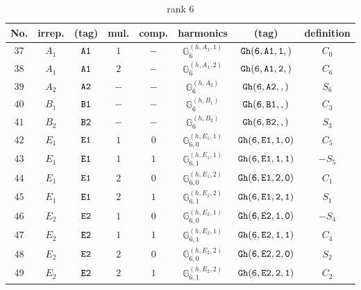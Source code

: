 \documentclass[fleqn,8pt]{jsarticle}
\begin{document}
\begin{table}[ht!]
\begin{center}
\caption{rank 6}
\renewcommand{\arraystretch}{1.3}
\begin{tabular}{cccccccc} \hline \hline
No. & irrep. & (tag) & mul. & comp. & harmonics & (tag) & definition \\ \hline
$ 37 $ & $ A_{1} $ & $ {\tt A1} $ & $ 1 $ & $ - $ & $ \mathbb{G}_{6}^{(h,A_{1},1)} $ & $ {\tt Gh(6,A1,1,)} $ & $ C_{0} $ \\
$ 38 $ & $ A_{1} $ & $ {\tt A1} $ & $ 2 $ & $ - $ & $ \mathbb{G}_{6}^{(h,A_{1},2)} $ & $ {\tt Gh(6,A1,2,)} $ & $ C_{6} $ \\
$ 39 $ & $ A_{2} $ & $ {\tt A2} $ & $ - $ & $ - $ & $ \mathbb{G}_{6}^{(h,A_{2})} $ & $ {\tt Gh(6,A2,,)} $ & $ S_{6} $ \\
$ 40 $ & $ B_{1} $ & $ {\tt B1} $ & $ - $ & $ - $ & $ \mathbb{G}_{6}^{(h,B_{1})} $ & $ {\tt Gh(6,B1,,)} $ & $ C_{3} $ \\
$ 41 $ & $ B_{2} $ & $ {\tt B2} $ & $ - $ & $ - $ & $ \mathbb{G}_{6}^{(h,B_{2})} $ & $ {\tt Gh(6,B2,,)} $ & $ S_{3} $ \\
$ 42 $ & $ E_{1} $ & $ {\tt E1} $ & $ 1 $ & $ 0 $ & $ \mathbb{G}_{6,0}^{(h,E_{1},1)} $ & $ {\tt Gh(6,E1,1,0)} $ & $ C_{5} $ \\
$ 43 $ & $ E_{1} $ & $ {\tt E1} $ & $ 1 $ & $ 1 $ & $ \mathbb{G}_{6,1}^{(h,E_{1},1)} $ & $ {\tt Gh(6,E1,1,1)} $ & $ - S_{5} $ \\
$ 44 $ & $ E_{1} $ & $ {\tt E1} $ & $ 2 $ & $ 0 $ & $ \mathbb{G}_{6,0}^{(h,E_{1},2)} $ & $ {\tt Gh(6,E1,2,0)} $ & $ C_{1} $ \\
$ 45 $ & $ E_{1} $ & $ {\tt E1} $ & $ 2 $ & $ 1 $ & $ \mathbb{G}_{6,1}^{(h,E_{1},2)} $ & $ {\tt Gh(6,E1,2,1)} $ & $ S_{1} $ \\
$ 46 $ & $ E_{2} $ & $ {\tt E2} $ & $ 1 $ & $ 0 $ & $ \mathbb{G}_{6,0}^{(h,E_{2},1)} $ & $ {\tt Gh(6,E2,1,0)} $ & $ - S_{4} $ \\
$ 47 $ & $ E_{2} $ & $ {\tt E2} $ & $ 1 $ & $ 1 $ & $ \mathbb{G}_{6,1}^{(h,E_{2},1)} $ & $ {\tt Gh(6,E2,1,1)} $ & $ C_{4} $ \\
$ 48 $ & $ E_{2} $ & $ {\tt E2} $ & $ 2 $ & $ 0 $ & $ \mathbb{G}_{6,0}^{(h,E_{2},2)} $ & $ {\tt Gh(6,E2,2,0)} $ & $ S_{2} $ \\
$ 49 $ & $ E_{2} $ & $ {\tt E2} $ & $ 2 $ & $ 1 $ & $ \mathbb{G}_{6,1}^{(h,E_{2},2)} $ & $ {\tt Gh(6,E2,2,1)} $ & $ C_{2} $ \\
 \hline \hline
\end{tabular}
\end{center}
\end{table}
\end{document}
